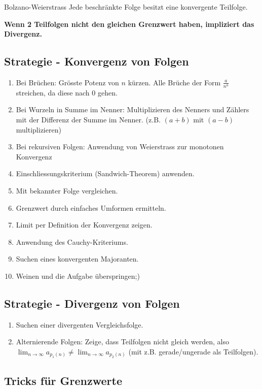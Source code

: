 \documentclass[a4paper,fontsize = 7pt]{scrartcl}
\def\limn{\lim_{n\to \infty}}
\begin{document}
\begin{subbox}{Bolzano-Weierstrass}
Jede beschränkte Folge besitzt eine konvergente Teilfolge.
\end{subbox}
 \textbf{Wenn 2 Teilfolgen nicht den gleichen Grenzwert haben, impliziert das Divergenz.}

\subsection{Strategie - Konvergenz von Folgen}
\begin{enumerate}
 \item Bei Brüchen: Grösste Potenz von $n$ kürzen. Alle Brüche der Form $\frac{a}{n^a}$ streichen, da diese nach 0 gehen.
 \item Bei Wurzeln in Summe im Nenner: Multiplizieren des Nenners und Zählers mit der Differenz der Summe im Nenner. (z.B. $(a+b)$ mit $(a-b)$ multiplizieren)
 \item Bei rekursiven Folgen: Anwendung von Weierstrass zur monotonen Konvergenz
 \item Einschliessungskriterium (Sandwich-Theorem) anwenden.
 \item Mit bekannter Folge vergleichen.
 \item Grenzwert durch einfaches Umformen ermitteln.
 \item Limit per Definition der Konvergenz zeigen.
 \item Anwendung des Cauchy-Kriteriums.
 \item Suchen eines konvergenten Majoranten. 
 \item Weinen und die Aufgabe überspringen;)
\end{enumerate}

\subsection{Strategie - Divergenz von Folgen}
\begin{enumerate}
 \item Suchen einer divergenten Vergleichsfolge.
 \item Alternierende Folgen: Zeige, dass Teilfolgen nicht gleich werden, also $\limn a_{p_1(n)} \ne \limn a_{p_2(n)}$ (mit z.B. gerade/ungerade als Teilfolgen).
\end{enumerate}

\subsection{Tricks für Grenzwerte}
\end{document}
